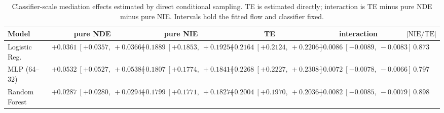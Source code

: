 \begin{table}[htbp]
  \centering
  \caption{Classifier-scale mediation effects estimated by direct conditional sampling. TE is estimated directly; interaction is TE minus pure NDE minus pure NIE. Intervals hold the fitted flow and classifier fixed.}
  \label{tab:german_synth_gap_overall}
  \begin{tabular}{lccccc}
    \toprule
    Model & pure NDE & pure NIE & TE & interaction & $|\mathrm{NIE}/\mathrm{TE}|$ \\
    \midrule
    Logistic Reg. & $+0.0361\ [+0.0357,\ +0.0366]$ & $+0.1889\ [+0.1853,\ +0.1925]$ & $+0.2164\ [+0.2124,\ +0.2206]$ & $-0.0086\ [-0.0089,\ -0.0083]$ & 0.873 \\
    MLP (64--32) & $+0.0532\ [+0.0527,\ +0.0538]$ & $+0.1807\ [+0.1774,\ +0.1841]$ & $+0.2268\ [+0.2227,\ +0.2308]$ & $-0.0072\ [-0.0078,\ -0.0066]$ & 0.797 \\
    Random Forest & $+0.0287\ [+0.0280,\ +0.0294]$ & $+0.1799\ [+0.1771,\ +0.1827]$ & $+0.2004\ [+0.1970,\ +0.2036]$ & $-0.0082\ [-0.0085,\ -0.0079]$ & 0.898 \\
    \bottomrule
  \end{tabular}
\end{table}